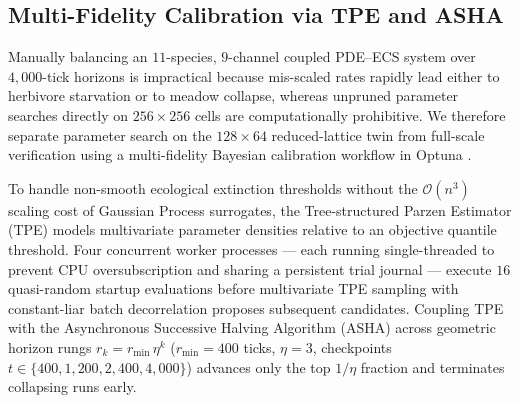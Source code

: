 

\subsection{Multi-Fidelity Calibration via TPE and ASHA}
\label{sec:optuna_methodology}

Manually balancing an $11$-species, $9$-channel coupled PDE--ECS system over $4{,}000$-tick horizons is impractical because mis-scaled rates rapidly lead either to herbivore starvation or to meadow collapse, whereas unpruned parameter searches directly on $256 \times 256$ cells are computationally prohibitive. We therefore separate parameter search on the $128 \times 64$ reduced-lattice twin from full-scale verification using a multi-fidelity Bayesian calibration workflow in Optuna \cite{akiba2019optuna}.

To handle non-smooth ecological extinction thresholds without the $\mathcal{O}(n^3)$ scaling cost of Gaussian Process surrogates, the Tree-structured Parzen Estimator (TPE) \cite{bergstra2011algorithms} models multivariate parameter densities relative to an objective quantile threshold. Four concurrent worker processes --- each running single-threaded to prevent CPU oversubscription and sharing a persistent trial journal --- execute $16$ quasi-random startup evaluations before multivariate TPE sampling with constant-liar batch decorrelation proposes subsequent candidates. Coupling TPE with the Asynchronous Successive Halving Algorithm (ASHA) \cite{li2020system} across geometric horizon rungs $r_k = r_{\min}\,\eta^k$ ($r_{\min} = 400$ ticks, $\eta = 3$, checkpoints $t \in \{400, 1{,}200, 2{,}400, 4{,}000\}$) advances only the top $1/\eta$ fraction and terminates collapsing runs early.

